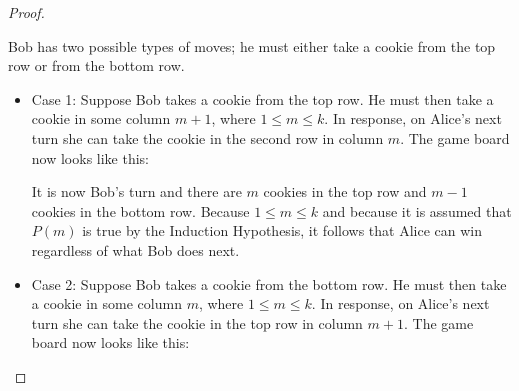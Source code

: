 \documentclass[11pt]{article}
\theoremstyle{plain}
\theoremstyle{plain}
\theoremstyle{remark}
\begin{document}
\begin{proof}
\begin{itemize}
\begin{center}
\begin{tikzpicture}[scale=0.75]
\end{tikzpicture}
\end{center}
Bob has two possible types of moves; he must either take a cookie from the top row or from the bottom row.
\begin{itemize}
    \item Case 1: Suppose Bob takes a cookie from the top row. He must then take a cookie in some column $m+1$, where $1\leq m\leq k$. In response, on Alice's next turn she can take the cookie in the second row in column $m$. The game board now looks like this:
\begin{center}
\end{center}
It is now Bob's turn and there are $m$ cookies in the top row and $m-1$ cookies in the bottom row. Because $1\leq m\leq k$ and because it is assumed that $P(m)$ is true by the Induction Hypothesis, it follows that Alice can win regardless of what Bob does next. 
\item Case 2: Suppose Bob takes a cookie from the bottom row. He must then take a cookie in some column $m$, where $1\leq m\leq k$. In response, on Alice's next turn she can take the cookie in the top row in column $m+1$. The game board now looks like this:
\begin{center}
\end{center}
\end{itemize}
\end{itemize}
\end{proof}
\end{document}

